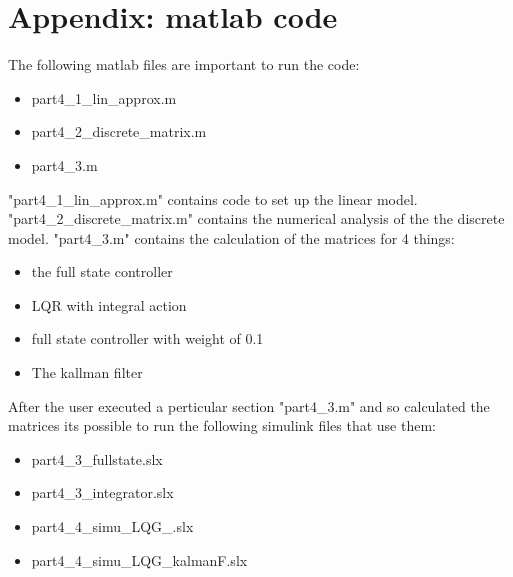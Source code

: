 \section{Appendix: matlab code}
The following matlab files are important to run the code:
\begin{itemize}
	\item part4\_1\_lin\_approx.m
	\item part4\_2\_discrete\_matrix.m
	\item part4\_3.m
\end{itemize}

"part4\_1\_lin\_approx.m" contains code to set up the linear model. "part4\_2\_discrete\_matrix.m" contains the numerical analysis of the the discrete model. "part4\_3.m" contains the calculation of the matrices for 4 things:

\begin{itemize}
	\item the full state controller
	\item LQR with integral action
	\item full state controller with weight of 0.1
	\item The kallman filter
\end{itemize}

After the user executed a perticular section "part4\_3.m"  and so calculated the matrices its possible to run the following simulink files that use them:

\begin{itemize}
	\item part4\_3\_fullstate.slx
	\item part4\_3\_integrator.slx
	\item part4\_4\_simu\_LQG\_.slx
	\item part4\_4\_simu\_LQG\_kalmanF.slx
\end{itemize}


